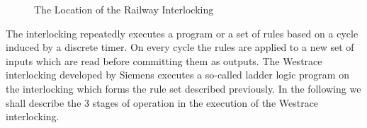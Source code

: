 \begin{figure}[h!]

\begin{center}
\end{center}

\caption{The Location of the Railway Interlocking}
\label{fig:trackstate}
\end{figure}

The interlocking repeatedly executes a program or a set of rules based on a cycle induced by a discrete timer. On every cycle the rules are applied to a new set of inputs which are read  before committing them as outputs. The Westrace interlocking developed by Siemens executes a so-called ladder logic program on the interlocking which forms the rule set described previously.  In the following we shall describe the 3 stages of operation in the execution of the Westrace interlocking.


\begin{comment}
The railway interlocking repeatedly executes a program or set of rules over some discrete time
interval. Each time it uses the set of
rules it contains to process a new set of inputs before committing them as
outputs. The Westrace interlocking used by Invensys Rail executes a so-called
ladder logic program to perform this process. 
The following are the three main stages of operation in the running of an
Westrace interlocking.
\end{comment}


